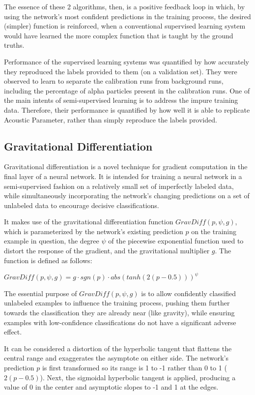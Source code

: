 \documentclass[10pt]{article}
\begin{document}
The essence of these 2 algorithms, then, is a positive feedback loop in which, by using the network's most confident predictions in the training process, the desired (simpler) function is reinforced, when a conventional supervised learning system would have learned the more complex function that is taught by the ground truths.

Performance of the supervised learning systems was quantified by how accurately they reproduced the labels provided to them (on a validation set). They were observed to learn to separate the calibration runs from background runs, including the percentage of alpha particles present in the calibration runs. One of the main intents of semi-supervised learning is to address the impure training data. Therefore, their performance is quantified by how well it is able to replicate Acoustic Parameter, rather than simply reproduce the labels provided.

\subsection{Gravitational Differentiation}

Gravitational differentiation is a novel technique for gradient computation in the final layer of a neural network. It is intended for training a neural network in a semi-supervised fashion on a relatively small set of imperfectly labeled data, while simultaneously incorporating the network's changing predictions on a set of unlabeled data to encourage decisive classifications.

It makes use of the gravitational differentiation function $GravDiff(p, \psi, g)$, which is parameterized by the network's existing prediction $p$ on the training example in question, the degree $\psi$ of the piecewise exponential function used to distort the response of the gradient, and the gravitational multiplier $g$. The function is defined as follows:

$GravDiff(p, \psi, g) = g \cdot sgn(p) \cdot abs(tanh(2(p - 0.5))) ^ \psi$

The essential purpose of $GravDiff(p, \psi, g)$ is to allow confidently classified unlabeled examples to influence the training process, pushing them further towards the classification they are already near (like gravity), while ensuring examples with low-confidence classifications do not have a significant adverse effect.

It can be considered a distortion of the hyperbolic tangent that flattens the central range and exaggerates the asymptote on either side. The network's prediction $p$ is first transformed so its range is 1 to -1 rather than 0 to 1 ($2(p - 0.5)$). Next, the sigmoidal hyperbolic tangent is applied, producing a value of 0 in the center and asymptotic slopes to -1 and 1 at the edges.
\end{document}
